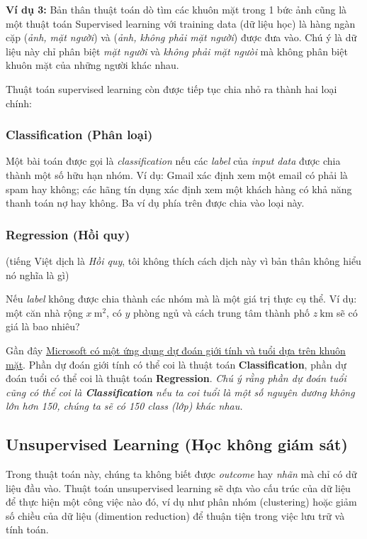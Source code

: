 \textbf{Ví dụ 3:} Bản thân thuật toán dò tìm các khuôn mặt trong 1 bức ảnh cũng là một thuật toán Supervised learning với training data (dữ liệu học) là hàng ngàn cặp (\textit{ảnh, mặt người}) và (\textit{ảnh, không phải mặt người}) được đưa vào. Chú ý là dữ liệu này chỉ phân biệt \textit{mặt người} và \textit{không phải mặt ngưòi} mà không phân biệt khuôn mặt của những người khác nhau. 
 
Thuật toán supervised learning còn được tiếp tục chia nhỏ ra thành hai loại chính:  
 
\subsubsection{Classification (Phân loại)}
 Một bài toán được gọi là \textit{classification} nếu các \textit{label} của \textit{input data} được chia thành một số hữu hạn nhóm. Ví dụ: Gmail xác định xem một email có phải là spam hay không; các hãng tín dụng xác định xem một khách hàng có khả năng thanh toán nợ hay không. Ba ví dụ phía trên được chia vào loại này.  
 
\subsubsection{Regression (Hồi quy)}
(tiếng Việt dịch là \textit{Hồi quy}, tôi không thích cách dịch này vì bản thân không hiểu nó nghĩa là gì) 
 
Nếu \textit{label} không được chia thành các nhóm mà là một giá trị thực cụ thể. Ví dụ: một căn nhà rộng $x ~ \text{m}^2$, có $y$ phòng ngủ và cách trung tâm thành phố $z~ \text{km}$ sẽ có giá là bao nhiêu? 
  
Gần đây \href{http://how-old.net/}{Microsoft có một ứng dụng dự đoán giới tính và tuổi dựa trên khuôn mặt}. Phần dự đoán giới tính có thể coi là thuật toán \textbf{Classification}, phần dự đoán tuổi có thể coi là thuật toán \textbf{Regression}. \textit{Chú ý rằng phần dự đoán tuổi cũng có thể coi là \textbf{Classification} nếu ta coi tuổi là một số nguyên dương không lớn hơn 150, chúng ta sẽ có 150 class (lớp) khác nhau.} 
 
\subsection{Unsupervised Learning (Học không giám sát)}
Trong thuật toán này, chúng ta không biết được \textit{outcome} hay \textit{nhãn} mà chỉ có dữ liệu đầu vào. Thuật toán unsupervised learning sẽ dựa vào cấu trúc của dữ liệu để thực hiện một công việc nào đó, ví dụ như phân nhóm (clustering) hoặc giảm số chiều của dữ liệu (dimention reduction) để thuận tiện trong việc lưu trữ và tính toán. 
 

